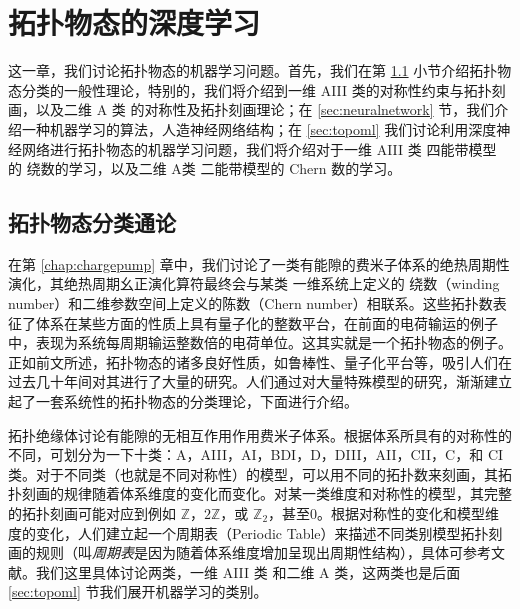 \chapter{拓扑物态的深度学习} \label{chap:topoml}

这一章，我们讨论拓扑物态的机器学习问题。首先，我们在第 \ref{sec:classify} 小节介绍拓扑物态分类的一般性理论，特别的，我们将介绍到一维 AIII 类的对称性约束与拓扑刻画，以及二维 A 类 的对称性及拓扑刻画理论；在 \ref{sec:neuralnetwork} 节，我们介绍一种机器学习的算法，人造神经网络结构；在 \ref{sec:topoml} 我们讨论利用深度神经网络进行拓扑物态的机器学习问题，我们将介绍对于一维 AIII 类 四能带模型 的 绕数的学习，以及二维 A类 二能带模型的 Chern 数的学习。



\section{拓扑物态分类通论} \label{sec:classify}
在第 \ref{chap:chargepump} 章中，我们讨论了一类有能隙的费米子体系的绝热周期性演化，其绝热周期幺正演化算符最终会与某类 一维系统上定义的 绕数（winding number）和二维参数空间上定义的陈数（Chern number）相联系。这些拓扑数表征了体系在某些方面的性质上具有量子化的整数平台，在前面的电荷输运的例子中，表现为系统每周期输运整数倍的电荷单位。这其实就是一个拓扑物态的例子。正如前文所述，拓扑物态的诸多良好性质，如鲁棒性、量子化平台等，吸引人们在过去几十年间对其进行了大量的研究。人们通过对大量特殊模型的研究，渐渐建立起了一套系统性的拓扑物态的分类理论\cite{topoclassify2016}，下面进行介绍。

拓扑绝缘体讨论有能隙的无相互作用作用费米子体系。根据体系所具有的对称性的不同，可划分为一下十类：A，AIII，AI，BDI，D，DIII，AII，CII，C，和 CI 类。对于不同类（也就是不同对称性）的模型，可以用不同的拓扑数来刻画，其拓扑刻画的规律随着体系维度的变化而变化。对某一类维度和对称性的模型，其完整的拓扑刻画可能对应到例如 $\mathbb{Z}$，$2\mathbb{Z}$，或 $\mathbb{Z}_2$，甚至0。根据对称性的变化和模型维度的变化，人们建立起一个周期表（Periodic Table）来描述不同类别模型拓扑刻画的规则（叫\textit{周期表}是因为随着体系维度增加呈现出周期性结构），具体可参考文献。我们这里具体讨论两类，一维 AIII 类 和二维 A 类，这两类也是后面 \ref{sec:topoml} 节我们展开机器学习的类别。

